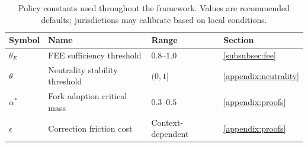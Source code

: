 \documentclass{article}
\begin{document}
\begin{table}[htbp]
\centering
\small
\caption{Policy constants used throughout the framework. Values are recommended defaults; jurisdictions may calibrate based on local conditions.}
\label{tab:policy-constants}
\begin{tabular}{@{}llll@{}}
\toprule
\textbf{Symbol} & \textbf{Name} & \textbf{Range} & \textbf{Section} \\
\midrule
$\theta_E$ & FEE sufficiency threshold & $0.8$--$1.0$ & \ref{subsubsec:fee} \\
$\theta$ & Neutrality stability threshold & $(0, 1]$ & \ref{appendix:neutrality} \\
$\alpha^*$ & Fork adoption critical mass & $0.3$--$0.5$ & \ref{appendix:proofs} \\
$\epsilon$ & Correction friction cost & Context-dependent & \ref{appendix:proofs} \\
\bottomrule
\end{tabular}
\end{table}
\end{document}
